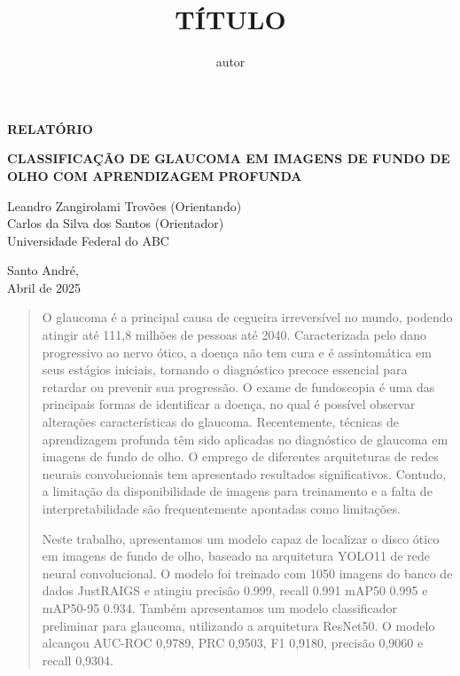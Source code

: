 \documentclass[12pt]{article}
\title{TÍTULO}
\author{autor}
\begin{document}
\thispagestyle{empty}
    \begin{flushright}
        \begin{huge}
            \textbf{RELATÓRIO}\\[3,5cm]
        \end{huge}
{\bf \LARGE  CLASSIFICAÇÃO DE GLAUCOMA EM IMAGENS DE FUNDO DE OLHO COM APRENDIZAGEM PROFUNDA}

\bigskip
        
        Leandro Zangirolami Trovões (Orientando)\\
        Carlos da Silva dos Santos (Orientador)\\
        Universidade Federal do ABC\\[5,5cm]
    \end{flushright}

    \vfill
    
    \begin{center}
        Santo André,\\
        Abril de 2025
    \end{center}
    
    \newpage
\bigskip

\begin{center}
\end{center}

\begin{quote}
O glaucoma é a principal causa de cegueira irreversível no mundo, podendo atingir até 111,8 milhões de pessoas até 2040. Caracterizada pelo dano progressivo ao nervo ótico, a doença não tem cura e é assintomática em seus estágios iniciais, tornando o diagnóstico precoce essencial para retardar ou prevenir sua progressão. O exame de fundoscopia é uma das principais formas de identificar a doença, no qual é possível observar alterações características do glaucoma. Recentemente, técnicas de aprendizagem profunda têm sido aplicadas no diagnóstico de glaucoma em imagens de fundo de olho. O emprego de diferentes arquiteturas de redes neurais convolucionais tem apresentado resultados significativos. Contudo, a limitação da disponibilidade de imagens para treinamento e a falta de interpretabilidade são frequentemente apontadas como limitações.

Neste trabalho, apresentamos um modelo capaz de localizar o disco ótico em imagens de fundo de olho, baseado na arquitetura YOLO11 de rede neural convolucional. O modelo foi treinado com 1050 imagens do banco de dados JustRAIGS e atingiu precisão 0.999, recall 0.991 mAP50 0.995 e mAP50-95 0.934. 
Também apresentamos um modelo classificador preliminar para glaucoma, utilizando a arquitetura ResNet50. O modelo alcançou AUC-ROC 0,9789, PRC 0,9503, F1 0,9180, precisão 0,9060 e recall 0,9304.

\end{quote}
\end{document}
